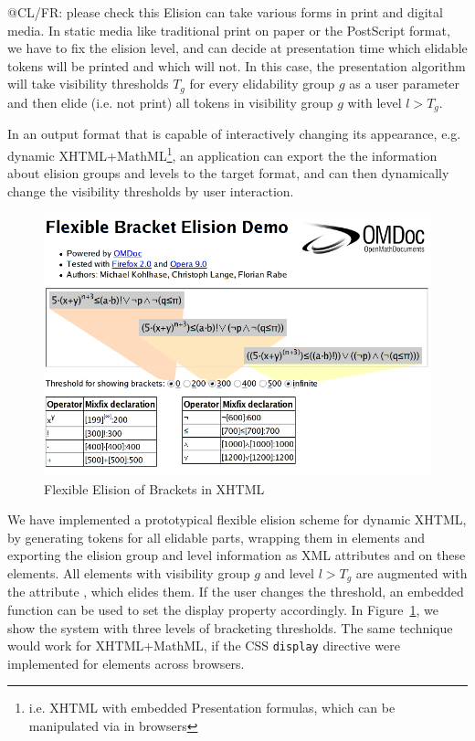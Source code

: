 \documentclass[a4paper]{article}
\def\javascript{{\sc{JavaScript}}}
\begin{document}
\begin{newpart}{@CL/FR: please check this}
  Elision can take various forms in print and digital media. In static media like
  traditional print on paper or the PostScript format, we have to fix the elision level, and
  can decide at presentation time which elidable tokens will be printed and which will
  not. In this case, the presentation algorithm will take visibility thresholds $T_g$ for
  every elidability group $g$ as a user parameter and then elide (i.e. not print) all
  tokens in visibility group $g$ with level $l>T_g$.

  In an output format that is capable of interactively changing its appearance,
  e.g. dynamic XHTML+MathML\footnote{i.e. XHTML with embedded Presentation {\mathml}
    formulas, which can be manipulated via {\javascript} in browsers}, an application can
  export the the information about elision groups and levels to the target format, and can
  then dynamically change the visibility thresholds by user interaction. 

\begin{figure}[ht]\centering
    \includegraphics[width=\columnwidth]{demo-shot}
    \caption{Flexible Elision of Brackets in XHTML}
    \label{fig:flexible-elision}
\end{figure}

  We have implemented a prototypical flexible elision scheme for dynamic XHTML, by
  generating tokens for all elidable parts, wrapping them in
  {} elements and exporting the elision group and level
  information as XML attributes {} and
  {} on these elements. All
  {} elements with visibility group $g$ and level $l>T_g$ are
  augmented with the attribute {}, which elides them. If the
  user changes the threshold, an embedded {\javascript} function can be used to set the
  display property accordingly. In Figure~\ref{fig:flexible-elision}, we show the system
  with three levels of bracketing thresholds. The same technique would work for
  XHTML+MathML, if the CSS {\tt{display}} directive were implemented for {\mathml}
  elements across browsers. 
\end{newpart}
\end{document}
